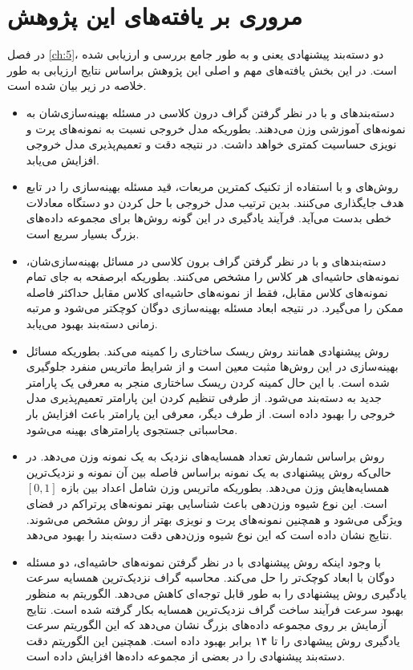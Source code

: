 \section{مروری بر یافته‌های این پژوهش}\label{sec:6:3}
در فصل \ref{ch:5}، دو دسته‌بند پیشنهادی یعنی  و  به طور جامع بررسی و ارزیابی شده است. در این بخش یافته‌های مهم و اصلی این پژوهش براساس نتایج ارزیابی به طور خلاصه در زیر بیان شده است.
\begin{itemize}[label=$\bullet$]
	\item دسته‌بند‌های   و   با در نظر گرفتن گراف درون کلاسی در مسئله بهینه‌سازی‌شان به نمونه‌های آموزشی وزن می‌دهند. بطوریکه مدل خروجی نسبت به نمونه‌های پرت و نویزی حساسیت کمتری خواهد داشت. در نتیجه دقت و تعمیم‌پذیری مدل خروجی افزایش می‌یابد.
	\item روش‌های   و   با استفاده از تکنیک کمترین مربعات، قید مسئله بهینه‌سازی را در تابع هدف جایگذاری می‌کنند. بدین ترتیب مدل خروجی با حل کردن دو دستگاه معادلات خطی بدست می‌آید. فرآیند یادگیری در این گونه روش‌ها برای مجموعه داده‌های بزرگ بسیار سریع است.
	\item دسته‌بند‌های  و   با در نظر گرفتن گراف برون کلاسی در مسائل بهینه‌سازی‌شان، نمونه‌های حاشیه‌ای هر کلاس را مشخص می‌کنند. بطوریکه ابرصفحه به جای تمام نمونه‌های کلاس مقابل، فقط از نمونه‌های ‌‌حاشیه‌ا‌ی‌ کلاس مقابل حداکثر فاصله ممکن را می‌گیرد. در نتیجه ابعاد مسئله بهینه‌سازی دوگان کوچکتر می‌شود و مرتبه زمانی دسته‌بند بهبود می‌یابد.
	\item روش پیشنهادی   همانند روش   ریسک ساختاری را کمینه می‌کند. بطوریکه مسائل بهینه‌سازی در این  روش‌ها مثبت معین است و از شرایط ماتریس منفرد جلوگیری شده است. با این حال کمینه کردن ریسک ساختاری منجر به معرفی یک پارامتر جدید به دسته‌بند می‌شود. از طرفی تنظیم کردن این پارامتر تعمیم‌پذیری مدل خروجی را بهبود داده است. از طرف دیگر، معرفی این پارامتر باعث افزایش بار محاسباتی جستجوی پارامترهای بهینه می‌شود. 
	\item روش   براساس شمارش تعداد همسایه‌های نزدیک به یک نمونه وزن می‌دهد. در حالی‌که روش پیشنهادی   به یک نمونه براساس فاصله بین آن نمونه و نزدیک‌ترین همسایه‌هایش وزن می‌دهد. بطوریکه ماتریس وزن شامل اعداد بین بازه   $\left[0,1\right]$ است. این نوع شیوه وزن‌دهی باعث شناسایی بهتر نمونه‌های پرتراکم در فضای ویژگی می‌شود و همچنین نمونه‌های پرت و نویزی بهتر از روش  مشخص می‌شوند. نتایج نشان داده است که این نوع شیوه وزن‌دهی دقت دسته‌بند  را بهبود می‌دهد.
	\item با وجود اینکه روش پیشنهادی    با در نظر گرفتن نمونه‌های حاشیه‌ای، دو مسئله دوگان با ابعاد کوچک‌تر را حل می‌کند. محاسبه گراف نزدیک‌ترین همسایه سرعت یادگیری روش پیشنهادی را به طور قابل توجه‌ای کاهش می‌دهد. الگوریتم   به منظور بهبود سرعت فرآیند ساخت گراف نزدیک‌ترین همسایه بکار گرفته شده است. نتایج آزمایش بر روی مجموعه داده‌های بزرگ نشان می‌دهد که این الگوریتم سرعت یادگیری روش پیشهادی را تا ۱۴ برابر بهبود داده است. همچنین این الگوریتم دقت دسته‌بند پیشنهادی  را در بعضی از مجموعه  داده‌ها افزایش داده است.
\end{itemize}

